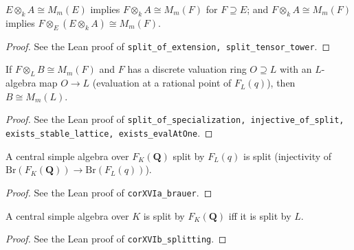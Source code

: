 \begin{lemma}
\label{lem:s5-split-base}
\leanok
$E\otimes_k A\cong M_m(E)$ implies $F\otimes_k A\cong M_m(F)$ for $F\supseteq E$; and $F\otimes_k A\cong M_m(F)$ implies $F\otimes_E(E\otimes_k A)\cong M_m(F)$.
\end{lemma}
\begin{proof}
\leanok
See the Lean proof of \texttt{split\_of\_extension, split\_tensor\_tower}.
\end{proof}

\begin{lemma}
\label{lem:s5-specialization}
\leanok
If $F\otimes_L B\cong M_m(F)$ and $F$ has a discrete valuation ring $O\supseteq L$ with an $L$-algebra map $O\to L$ (evaluation at a rational point of $F_L(q)$), then $B\cong M_m(L)$.
\end{lemma}
\begin{proof}
\leanok
See the Lean proof of \texttt{split\_of\_specialization, injective\_of\_split, exists\_stable\_lattice, exists\_evalAtOne}.
\end{proof}

\begin{corollary}
\label{cor:XVIa}
\leanok
A central simple algebra over $F_K(\mathbf Q)$ split by $F_L(q)$ is split (injectivity of $\mathrm{Br}(F_K(\mathbf Q))\to\mathrm{Br}(F_L(q))$).
\end{corollary}
\begin{proof}
\leanok
See the Lean proof of \texttt{corXVIa\_brauer}.
\end{proof}

\begin{corollary}
\label{cor:XVIb}
\leanok
A central simple algebra over $K$ is split by $F_K(\mathbf Q)$ iff it is split by $L$.
\end{corollary}
\begin{proof}
\leanok
See the Lean proof of \texttt{corXVIb\_splitting}.
\end{proof}

